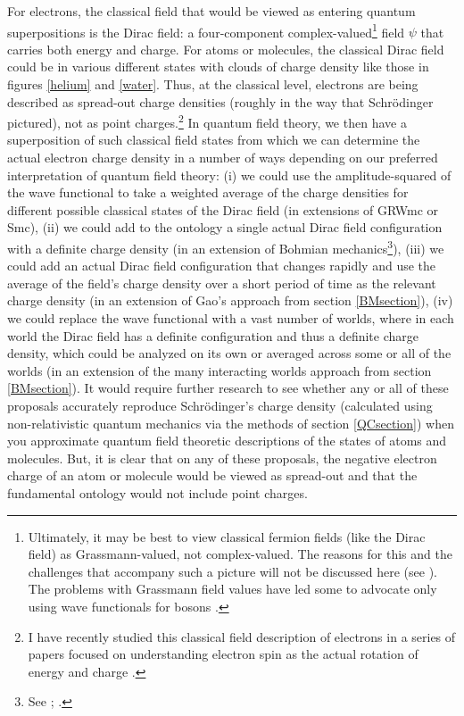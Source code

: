 \documentclass[12pt,onecolumn,secnumarabic,amsmath,amssymb,balancelastpage,nofootinbib]{article}
\begin{document}
For electrons, the classical field that would be viewed as entering quantum superpositions is the Dirac field: a four-component complex-valued\footnote{Ultimately, it may be best to view classical fermion fields (like the Dirac field) as Grassmann-valued, not complex-valued.  The reasons for this and the challenges that accompany such a picture will not be discussed here (see \cite{floreanini1988, jackiw1990, hatfield, valentini1992, valentini1996, struyve2010, struyve2011, positrons}).  The problems with Grassmann field values have led some to advocate only using wave functionals for bosons \cite{bohm1987, bohmhiley}.} field $\psi$ that carries both energy and charge.  For atoms or molecules, the classical Dirac field could be in various different states with clouds of charge density like those in figures \ref{helium} and \ref{water}.  Thus, at the classical level, electrons are being described as spread-out charge densities (roughly in the way that Schr\"{o}dinger pictured), not as point charges.\footnote{I have recently studied this classical field description of electrons in a series of papers focused on understanding electron spin as the actual rotation of energy and charge \cite{howelectronsspin, smallelectronstates, positrons, electronsspinmeasurement}.}  In quantum field theory, we then have a superposition of such classical field states from which we can determine the actual electron charge density in a number of ways depending on our preferred interpretation of quantum field theory: (i) we could use the amplitude-squared of the wave functional to take a weighted average of the charge densities for different possible classical states of the Dirac field (in extensions of GRWmc or Smc), (ii) we could add to the ontology a single actual Dirac field configuration with a definite charge density (in an extension of Bohmian mechanics\footnote{See \cite[ch.\ 4]{valentini1992}; \cite{valentini1996, struyve2010, struyve2011}.}), (iii) we could add an actual Dirac field configuration that changes rapidly and use the average of the field's charge density over a short period of time as the relevant charge density (in an extension of Gao's approach from section \ref{BMsection}), (iv) we could replace the wave functional with a vast number of worlds, where in each world the Dirac field has a definite configuration and thus a definite charge density, which could be analyzed on its own or averaged across some or all of the worlds (in an extension of the many interacting worlds approach from section \ref{BMsection}).  It would require further research to see whether any or all of these proposals accurately reproduce Schr\"{o}dinger's charge density (calculated using non-relativistic quantum mechanics via the methods of section \ref{QCsection}) when you approximate quantum field theoretic descriptions of the states of atoms and molecules.  But, it is clear that on any of these proposals, the negative electron charge of an atom or molecule would be viewed as spread-out and that the fundamental ontology would not include point charges.
\end{document}
